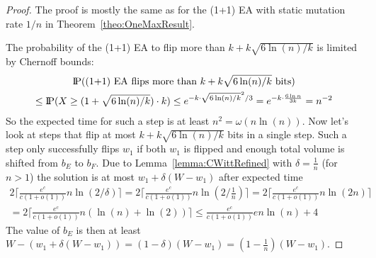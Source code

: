 \begin{proof}
      The proof is mostly the same as for the (1+1) EA with static mutation rate $1/n$ in Theorem~\ref{theo:OneMaxResult}.

      The probability of the (1+1) EA to flip more than $k+k\sqrt{6\ln(n)/k}$ is limited by Chernoff bounds:
      \begin{gather}
            \nonumber \text{I\kern-0.15em P}(\text{(1+1) EA flips more than }k+k\sqrt{6\ln(n)/k}\text{ bits})\\ \nonumber
            \le\text{I\kern-0.15em P}(X\ge (1+\sqrt{6\ln(n)/k})\cdot k)
            \le e^{-k\cdot{\sqrt{6\ln(n)/k}}^2/3}
            = e^{-k\cdot \frac{6\ln n}{3k}}
            = n^{-2}
      \end{gather}
      So the expected time for such a step is at least \(n^2=\omega(n\ln(n))\).
      Now let's look at steps that flip at most $k+k\sqrt{6\ln(n)/k}$ bits in a single step.
      Such a step only successfully flips $w_1$ if both $w_1$ is flipped and enough total volume is shifted from $b_E$ to $b_F$.
      Due to Lemma~\ref{lemma:CWittRefined} with $\delta=\frac{1}{n}$ (for $n>1$) the solution is at most $w_1+\delta(W-w_1)$ after expected time
      \begin{gather}\nonumber
            2\lceil\frac{e^c}{c(1+o(1))}n\ln(2/\delta)\rceil
            =2\lceil\frac{e^c}{c(1+o(1))}n\ln(2/\frac{1}{n})\rceil
            =2\lceil\frac{e^c}{c(1+o(1))}n\ln(2n)\rceil \\ \nonumber
            =2\lceil\frac{e^c}{c(1+o(1))}n(\ln(n)+\ln(2))\rceil
            \le\frac{e^c}{c(1+o(1))}en\ln(n)+4    
      \end{gather}
      The value of $b_E$ is then at least \(W-(w_1+\delta(W-w_1))=(1-\delta)(W-w_1)=(1-\frac{1}{n})(W-w_1)\).


\end{proof}
